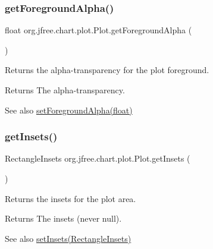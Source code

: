 \subsubsection{\texorpdfstring{get\+Foreground\+Alpha()}{getForegroundAlpha()}}
{\footnotesize\ttfamily float org.\+jfree.\+chart.\+plot.\+Plot.\+get\+Foreground\+Alpha (\begin{DoxyParamCaption}{ }\end{DoxyParamCaption})}

Returns the alpha-\/transparency for the plot foreground.

\begin{DoxyReturn}{Returns}
The alpha-\/transparency.
\end{DoxyReturn}
\begin{DoxySeeAlso}{See also}
\mbox{\hyperlink{classorg_1_1jfree_1_1chart_1_1plot_1_1_plot_a664fc2bc0ce9e5d2a1e8aa5bc8d01d04}{set\+Foreground\+Alpha(float)}} 
\end{DoxySeeAlso}
\mbox{\label{classorg_1_1jfree_1_1chart_1_1plot_1_1_plot_a8c217375afeb9eae164af090797aacf1}} 
\subsubsection{\texorpdfstring{get\+Insets()}{getInsets()}}
{\footnotesize\ttfamily Rectangle\+Insets org.\+jfree.\+chart.\+plot.\+Plot.\+get\+Insets (\begin{DoxyParamCaption}{ }\end{DoxyParamCaption})}

Returns the insets for the plot area.

\begin{DoxyReturn}{Returns}
The insets (never {\ttfamily null}).
\end{DoxyReturn}
\begin{DoxySeeAlso}{See also}
\mbox{\hyperlink{classorg_1_1jfree_1_1chart_1_1plot_1_1_plot_a53965b8c7aa0ea6215a2f37447112ba5}{set\+Insets(\+Rectangle\+Insets)}} 
\end{DoxySeeAlso}
\mbox{\label{classorg_1_1jfree_1_1chart_1_1plot_1_1_plot_ab6cb27f0e674cc0a3bab4d214cc70f5d}} 
